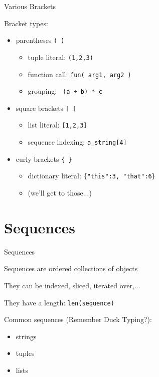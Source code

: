 \documentclass{beamer}
\begin{document}
\begin{frame}[fragile]{Various Brackets}

{\Large Bracket types:}

\begin{itemize}
  \item parentheses \verb+( )+
    \begin{itemize}
      \item tuple literal: \verb+(1,2,3)+
      \item function call: \verb+fun( arg1, arg2 )+
      \item grouping: \verb| (a + b) * c |
    \end{itemize}
  \item square brackets \verb+[ ]+
    \begin{itemize}
      \item list literal: \verb+[1,2,3]+
      \item sequence indexing: \verb+a_string[4]+
    \end{itemize}
  \item curly brackets \verb+{ }+
    \begin{itemize}
      \item dictionary literal: \verb+{"this":3, "that":6}+
      \item (we'll get to those...)
    \end{itemize}
\end{itemize}

\end{frame}


\section {Sequences}

\begin{frame}[fragile]{Sequences}

{\Large Sequences are ordered collections of objects}

\vfill
{\Large They can be indexed, sliced, iterated over,...}

\vfill
{\Large They have a length:  \verb+len(sequence)+}

\vfill
{\Large Common sequences (Remember Duck Typing?):}

{\Large
\begin{itemize}
   \item strings
   \item tuples
   \item lists
\end{itemize}
}

\end{frame}
\end{document}
